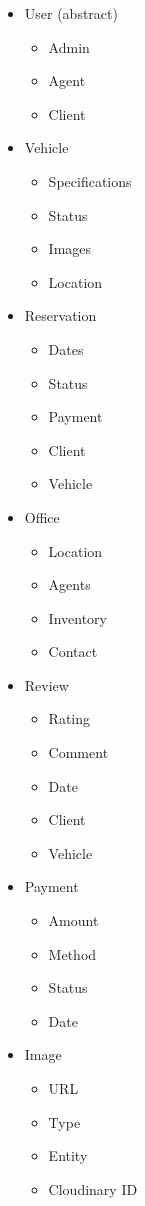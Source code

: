 \begin{itemize}
    \item User (abstract)
    \begin{itemize}
        \item Admin
        \item Agent
        \item Client
    \end{itemize}
    \item Vehicle
    \begin{itemize}
        \item Specifications
        \item Status
        \item Images
        \item Location
    \end{itemize}
    \item Reservation
    \begin{itemize}
        \item Dates
        \item Status
        \item Payment
        \item Client
        \item Vehicle
    \end{itemize}
    \item Office
    \begin{itemize}
        \item Location
        \item Agents
        \item Inventory
        \item Contact
    \end{itemize}
    \item Review
    \begin{itemize}
        \item Rating
        \item Comment
        \item Date
        \item Client
        \item Vehicle
    \end{itemize}
    \item Payment
    \begin{itemize}
        \item Amount
        \item Method
        \item Status
        \item Date
    \end{itemize}
    \item Image
    \begin{itemize}
        \item URL
        \item Type
        \item Entity
        \item Cloudinary ID
    \end{itemize}
\end{itemize}

